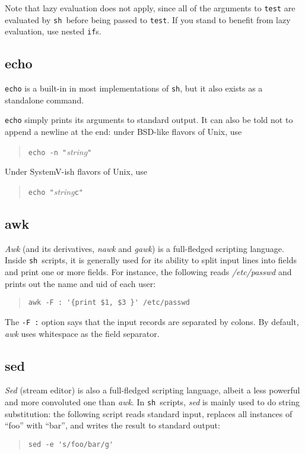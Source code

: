 \documentclass{article}
\newcommand{\fname}[1]{\textsl{#1}}
\newcommand{\code}[1]{\texttt{#1}}
\newcommand{\bs}{\symbol{"5C}}
\newcommand{\sh}{\code{sh}}
\begin{document}
	Note that lazy evaluation does not apply, since all of the
arguments to \code{test} are evaluated by \sh\ before being passed to
\code{test}. If you stand to benefit from lazy evaluation, use
nested \code{if}s.

\subsection{echo}

	\code{echo} is a built-in in most implementations of \sh, but
it also exists as a standalone command.

	\code{echo} simply prints its arguments to standard output. It
can also be told not to append a newline at the end: under BSD-like
flavors of Unix, use
\begin{quote}
\code{echo -n "}\textit{string}\code{"}
\end{quote}
Under SystemV-ish flavors of Unix, use
\begin{quote}
\code{echo "}\textit{string}\code{\bs c"}
\end{quote}

\subsection{awk}

	\fname{Awk} (and its derivatives, \fname{nawk} and
\fname{gawk}) is a full-fledged scripting language. Inside \sh\
scripts, it is generally used for its ability to split input lines
into fields and print one or more fields. For instance, the following
reads \fname{/etc/passwd} and prints out the name and uid of each
user:
\begin{quote}
\begin{verbatim}
awk -F : '{print $1, $3 }' /etc/passwd
\end{verbatim}
\end{quote}

	The \code{-F :} option says that the input records are
separated by colons. By default, \fname{awk} uses whitespace as the
field separator.

\subsection{sed}

	\fname{Sed} (stream editor) is also a full-fledged scripting
language, albeit a less powerful and more convoluted one than
\fname{awk}. In \sh\ scripts, \fname{sed} is mainly used to do string
substitution: the following script reads standard input, replaces all
instances of ``foo'' with ``bar'', and writes the result to standard
output:
\begin{quote}
\begin{verbatim}
sed -e 's/foo/bar/g'
\end{verbatim}
\end{quote}
\end{document}
